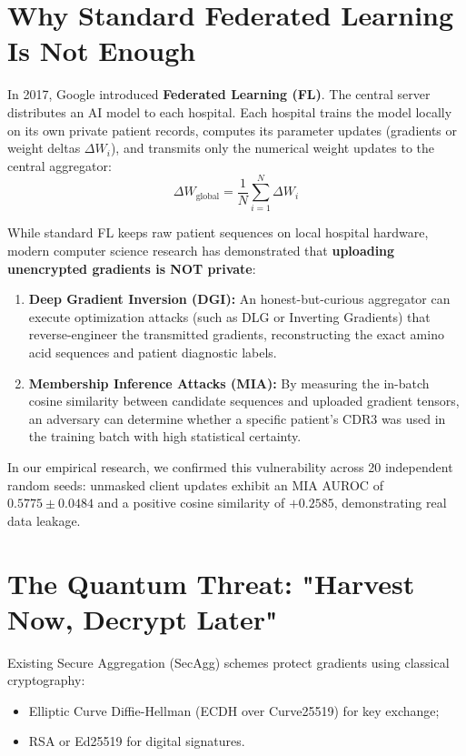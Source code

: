 \documentclass[11pt,a4paper]{report}
\begin{document}
\section{Why Standard Federated Learning Is Not Enough}
In 2017, Google introduced \textbf{Federated Learning (FL)}. The central server distributes an AI model to each hospital. Each hospital trains the model locally on its own private patient records, computes its parameter updates (gradients or weight deltas $\Delta W_i$), and transmits only the numerical weight updates to the central aggregator:
\begin{equation}
\Delta W_{\text{global}} = \frac{1}{N} \sum_{i=1}^N \Delta W_i
\end{equation}

While standard FL keeps raw patient sequences on local hospital hardware, modern computer science research has demonstrated that \textbf{uploading unencrypted gradients is NOT private}:
\begin{enumerate}[itemsep=2pt]
  \item \textbf{Deep Gradient Inversion (DGI):} An honest-but-curious aggregator can execute optimization attacks (such as DLG or Inverting Gradients) that reverse-engineer the transmitted gradients, reconstructing the exact amino acid sequences and patient diagnostic labels.
  \item \textbf{Membership Inference Attacks (MIA):} By measuring the in-batch cosine similarity between candidate sequences and uploaded gradient tensors, an adversary can determine whether a specific patient's CDR3 was used in the training batch with high statistical certainty.
\end{enumerate}

In our empirical research, we confirmed this vulnerability across 20 independent random seeds: unmasked client updates exhibit an MIA AUROC of $\mathbf{0.5775 \pm 0.0484}$ and a positive cosine similarity of $\mathbf{+0.2585}$, demonstrating real data leakage.

\section{The Quantum Threat: "Harvest Now, Decrypt Later"}
Existing Secure Aggregation (SecAgg) schemes protect gradients using classical cryptography:
\begin{itemize}[itemsep=1pt]
  \item Elliptic Curve Diffie-Hellman (ECDH over Curve25519) for key exchange;
  \item RSA or Ed25519 for digital signatures.
\end{itemize}
\end{document}
